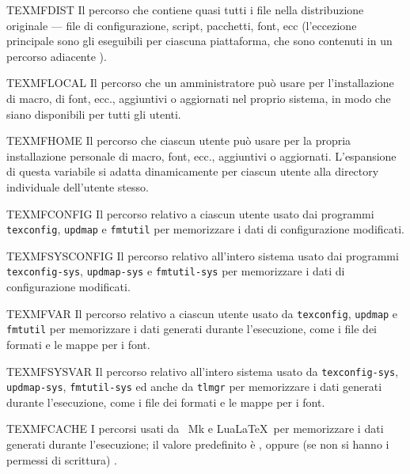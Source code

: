 \documentclass{article}
\begin{document}
\begin{ttdescription}
\item [TEXMFDIST] Il percorso che contiene quasi tutti i file nella
  distribuzione originale --- file di configurazione, script, pacchetti,
  font, ecc (l'eccezione principale sono gli eseguibili per ciascuna
  piattaforma, che sono contenuti in un percorso adiacente ).
\item [TEXMFLOCAL] Il percorso che un amministratore può usare per
  l'installazione di macro, di font, ecc., aggiuntivi o aggiornati nel
  proprio sistema, in modo che siano disponibili per tutti gli utenti.
\item [TEXMFHOME] Il percorso che ciascun utente può usare per la propria
  installazione personale di macro, font, ecc., aggiuntivi o aggiornati.
  L'espansione di questa variabile si adatta dinamicamente per ciascun
  utente alla directory individuale dell'utente stesso.
\item [TEXMFCONFIG] Il percorso relativo a ciascun utente usato dai
  programmi \verb+texconfig+, \verb+updmap+ e \verb+fmtutil+ per
  memorizzare i dati di configurazione modificati.
\item [TEXMFSYSCONFIG] Il percorso relativo all'intero sistema usato dai
  programmi \verb+texconfig-sys+, \verb+updmap-sys+ e \verb+fmtutil-sys+
  per memorizzare i dati di configurazione modificati.
\item [TEXMFVAR] Il percorso relativo a ciascun utente usato da
  \verb+texconfig+, \verb+updmap+ e \verb+fmtutil+ per memorizzare i dati
  generati durante l'esecuzione, come i file dei formati e le mappe per i
  font.
\item [TEXMFSYSVAR] Il percorso relativo all'intero sistema usato da
  \verb+texconfig-sys+, \verb+updmap-sys+, \verb+fmtutil-sys+ ed anche da
  \verb+tlmgr+ per memorizzare i dati generati durante l'esecuzione, come
  i file dei formati e le mappe per i font.
\item [TEXMFCACHE] I percorsi usati da \ConTeXt\ Mk e Lua\LaTeX\
  per memorizzare i dati generati durante l'esecuzione; il valore
  predefinito è \code{TEXMFSYSVAR}, oppure (se non si hanno i permessi di
  scrittura) \code{TEXMFVAR}.
\end{ttdescription}
\end{document}
